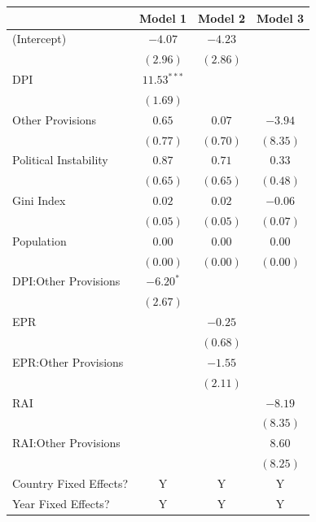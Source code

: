 \documentclass[12pt]{article}
\begin{document}
\begin{table}[!htbp]
	\begin{center}
		\begin{tabular}{l c c c }
			\hline
			& Model 1 & Model 2 & Model 3 \\
			\hline
			(Intercept)                          & $-4.07$       & $-4.23$  &          \\
			& $(2.96)$      & $(2.86)$ &          \\
			DPI                           & $11.53^{***}$ &          &          \\
			& $(1.69)$      &          &          \\
			Other Provisions                    & $0.65$        & $0.07$   & $-3.94$  \\
			& $(0.77)$      & $(0.70)$ & $(8.35)$ \\
			Political Instability                       & $0.87$        & $0.71$   & $0.33$   \\
			& $(0.65)$      & $(0.65)$ & $(0.48)$ \\
			Gini Index                      & $0.02$        & $0.02$   & $-0.06$  \\
			& $(0.05)$      & $(0.05)$ & $(0.07)$ \\
			Population                        & $0.00$        & $0.00$   & $0.00$   \\
			& $(0.00)$      & $(0.00)$ & $(0.00)$ \\
			DPI:Other Provisions         & $-6.20^{*}$   &          &          \\
			& $(2.67)$      &          &          \\
			EPR                   &               & $-0.25$  &          \\
			&               & $(0.68)$ &          \\
			EPR:Other Provisions &               & $-1.55$  &          \\
			&               & $(2.11)$ &          \\
			RAI                          &               &          & $-8.19$  \\
			&               &          & $(8.35)$ \\
			RAI:Other Provisions        &               &          & $8.60$   \\
			&               &          & $(8.25)$ \\
			\hline
			Country Fixed Effects?		 		 & Y			 & Y 		& Y			  \\
			Year Fixed Effects?			 		 & Y			 & Y		& Y			  \\

\end{tabular}
\end{center}
\end{table}
\end{document}

